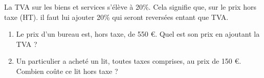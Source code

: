 {\begin{Exercice} %
La TVA sur les biens et services s'élève à 20\%. Cela signifie que, sur le prix hors taxe (HT). il faut lui ajouter 20\% qui seront reversées entant que TVA.
\begin{enumerate}
\item Le prix d'un bureau est, hors taxe, de 550 €. Quel est son prix en ajoutant la TVA ?
\item Un particulier a acheté un lit, toutes taxes comprises, au prix de 150 €. Combien coûte ce lit hors taxe ?
\end{enumerate}

\end{Exercice}

}
